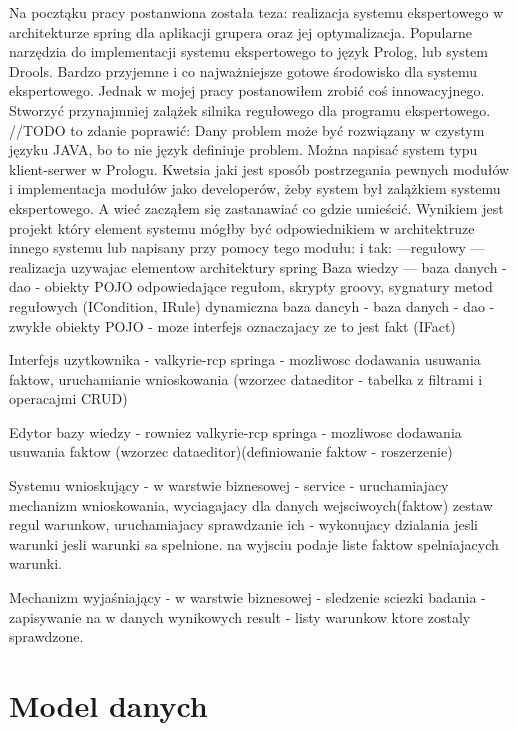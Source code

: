 Na pocztąku pracy postanwiona została teza: realizacja systemu ekspertowego w architekturze spring dla aplikacji grupera oraz jej optymalizacja.
Popularne narzędzia do implementacji systemu ekspertowego to język Prolog, lub system Drools. Bardzo przyjemne i co najważniejsze gotowe środowisko dla systemu ekspertowego. Jednak w mojej pracy postanowiłem zrobić coś innowacyjnego. Stworzyć przynajmniej zalążek silnika regułowego dla programu ekspertowego.
//TODO to zdanie poprawić: Dany problem może być rozwiązany w czystym języku JAVA, bo to nie język definiuje problem. Można napisać system typu klient-serwer w Prologu. Kwetsia jaki jest sposób postrzegania pewnych modułów i implementacja modułów jako developerów, żeby system był zalążkiem systemu ekspertowego.
A wieć zacząłem się zastanawiać co gdzie umieścić. Wynikiem jest projekt który element systemu mógłby być odpowiednikiem w architektruze innego systemu lub napisany przy pomocy tego modułu:
i tak:
---regułowy  ---   realizacja uzywajac elementow architektury spring
Baza wiedzy  ---  baza danych - dao - obiekty POJO odpowiedające regułom, skrypty groovy, sygnatury metod regułowych (ICondition, IRule)
dynamiczna baza dancyh - baza danych - dao - zwykłe obiekty POJO - moze interfejs oznaczajacy ze to jest fakt (IFact)

Interfejs uzytkownika - valkyrie-rcp springa - mozliwosc dodawania usuwania faktow, uruchamianie wnioskowania (wzorzec dataeditor - tabelka z filtrami i operacajmi CRUD)

Edytor bazy wiedzy - rowniez valkyrie-rcp springa - mozliwosc dodawania usuwania faktow (wzorzec dataeditor)(definiowanie faktow - roszerzenie)

Systemu wnioskujący - w warstwie biznesowej - service - uruchamiajacy mechanizm wnioskowania, wyciagajacy dla danych wejsciwoych(faktow) zestaw regul warunkow, uruchamiajacy sprawdzanie ich - wykonujacy dzialania jesli warunki jesli warunki sa spelnione. na wyjsciu podaje liste faktow spelniajacych warunki.

Mechanizm wyjaśniający - w warstwie biznesowej - sledzenie sciezki badania - zapisywanie na w danych wynikowych result - listy warunkow ktore zostaly sprawdzone.


\section{Model danych}
\label{sec:modelDanych}

